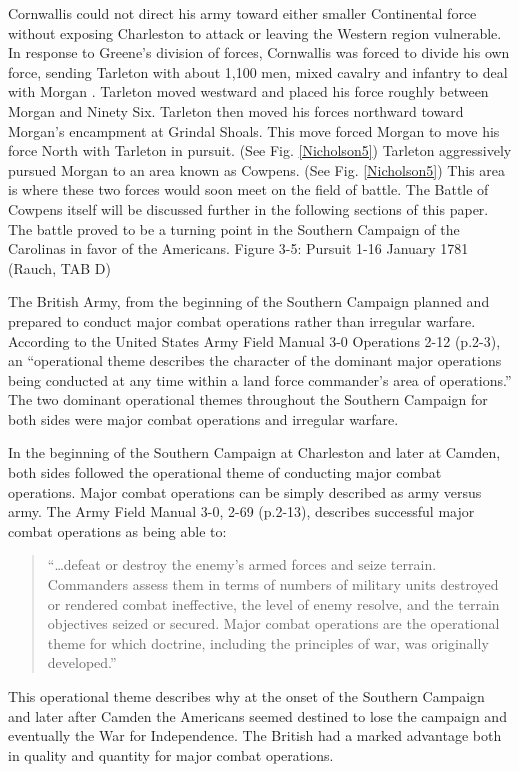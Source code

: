 Cornwallis could not direct his army toward either smaller Continental force
without exposing Charleston to attack or leaving the Western region vulnerable.
In response to Greene’s division of forces, Cornwallis was forced to divide his
own force, sending Tarleton with about 1,100 men, mixed cavalry and infantry to
deal with Morgan \cite[28]{weigley_partisan_1970}.   Tarleton moved westward and placed his force
roughly between Morgan and Ninety Six.  Tarleton then moved his forces northward
toward Morgan’s encampment at Grindal Shoals.   This move forced Morgan to move
his force North with Tarleton in pursuit. (See Fig. \ref{Nicholson5}) Tarleton aggressively
pursued Morgan to an area known as Cowpens. (See Fig. \ref{Nicholson5}) This area is where
these two forces would soon meet on the field of battle.  The Battle of Cowpens
itself will be discussed further in the following sections of this paper.  The
battle proved to be a turning point in
the Southern Campaign of the Carolinas in favor of the Americans. 
Figure 3-5: Pursuit 1-16 January 1781 (Rauch, TAB D)

The British Army, from the beginning of the Southern Campaign planned and
prepared to conduct major combat operations rather than irregular warfare.
According to the United States Army Field Manual 3-0 Operations 2-12 (p.2-3), an
“operational theme describes the character of the dominant major operations
being conducted at any time within a land force commander’s area of operations.”
The two dominant operational themes throughout the Southern Campaign for both
sides were major combat operations and irregular warfare.

In the beginning of the Southern Campaign at Charleston and later at Camden,
both sides followed the operational theme of conducting major combat operations.
Major combat operations can be simply described as army versus army.  The Army
Field Manual 3-0, 2-69 (p.2-13), describes successful major combat operations as
being able to:

\begin{quote}
“…defeat or destroy the enemy’s armed forces and seize terrain.
Commanders assess them in terms of numbers of military units destroyed or
rendered combat ineffective, the level of enemy resolve, and the terrain
objectives seized or secured. Major combat operations are the operational
theme for which doctrine, including the principles of war, was originally
developed.”
\end{quote}

This operational theme describes why at the onset of the Southern Campaign and
later after Camden the Americans seemed destined to lose the campaign and
eventually the War for Independence.  The British had a marked advantage both in
quality and quantity for major combat operations.

